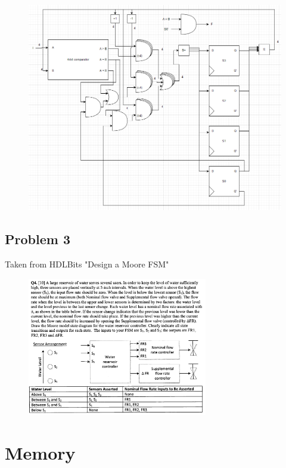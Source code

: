 \documentclass{article}
\begin{document}
\begin{enumerate}[label=\alph*.]
\begin{figure}[!h]
    \includegraphics[width=1\textwidth]{figures/fsm2e-solution.png}
\end{figure}
\end{enumerate}

\newpage
\subsection*{Problem 3}
Taken from HDLBits "Design a Moore FSM"\\
\begin{figure}[!h]
    \centering
    \includegraphics[width=0.7\textwidth]{figures/fsm_q3.png}
\end{figure}


\newpage
\section*{Memory}
\end{document}
